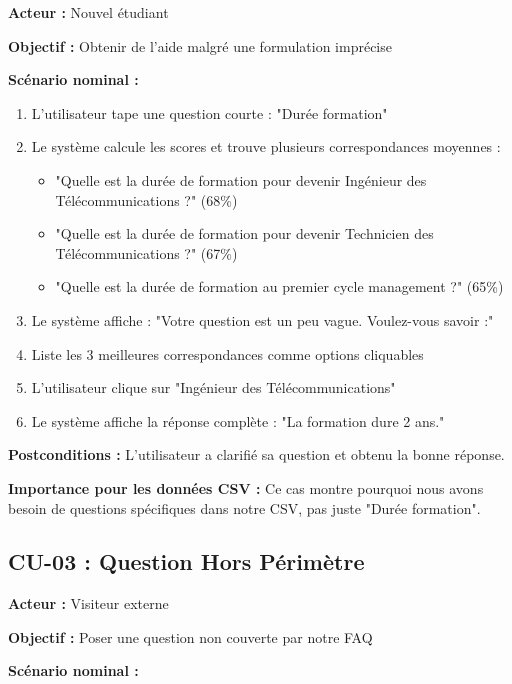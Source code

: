 \documentclass[11pt,a4paper]{article}
\begin{document}
\textbf{Acteur :} Nouvel étudiant

\textbf{Objectif :} Obtenir de l'aide malgré une formulation imprécise

\textbf{Scénario nominal :}

\begin{enumerate}
    \item L'utilisateur tape une question courte : "Durée formation"
    \item Le système calcule les scores et trouve plusieurs correspondances moyennes :
    \begin{itemize}
        \item "Quelle est la durée de formation pour devenir Ingénieur des Télécommunications ?" (68\%)
        \item "Quelle est la durée de formation pour devenir Technicien des Télécommunications ?" (67\%)
        \item "Quelle est la durée de formation au premier cycle management ?" (65\%)
    \end{itemize}
    \item Le système affiche : "Votre question est un peu vague. Voulez-vous savoir :"
    \item Liste les 3 meilleures correspondances comme options cliquables
    \item L'utilisateur clique sur "Ingénieur des Télécommunications"
    \item Le système affiche la réponse complète : "La formation dure 2 ans."
\end{enumerate}

\textbf{Postconditions :} L'utilisateur a clarifié sa question et obtenu la bonne réponse.

\textbf{Importance pour les données CSV :} Ce cas montre pourquoi nous avons besoin de questions spécifiques dans notre CSV, pas juste "Durée formation".

\subsection{CU-03 : Question Hors Périmètre}

\textbf{Acteur :} Visiteur externe

\textbf{Objectif :} Poser une question non couverte par notre FAQ

\textbf{Scénario nominal :}
\end{document}
